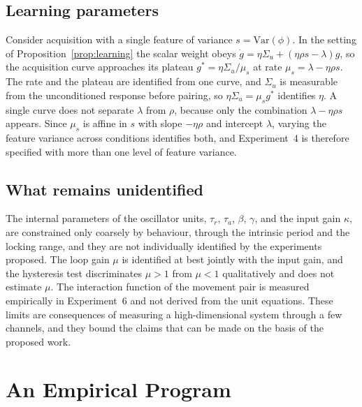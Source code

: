 \documentclass[11pt]{article}
\theoremstyle{plain}
\theoremstyle{definition}
\begin{document}
\subsection{Learning parameters}

Consider acquisition with a single feature of variance $s=\mathrm{Var}(\phi)$. In the setting of Proposition~\ref{prop:learning} the scalar weight obeys $\dot g=\eta\Sigma_u+(\eta\rho s-\lambda)g$, so the acquisition curve approaches its plateau $g^{\ast}=\eta\Sigma_u/\mu_s$ at rate $\mu_s=\lambda-\eta\rho s$. The rate and the plateau are identified from one curve, and $\Sigma_u$ is measurable from the unconditioned response before pairing, so $\eta\Sigma_u=\mu_s g^{\ast}$ identifies $\eta$. A single curve does not separate $\lambda$ from $\rho$, because only the combination $\lambda-\eta\rho s$ appears. Since $\mu_s$ is affine in $s$ with slope $-\eta\rho$ and intercept $\lambda$, varying the feature variance across conditions identifies both, and Experiment~4 is therefore specified with more than one level of feature variance.

\subsection{What remains unidentified}

The internal parameters of the oscillator units, $\tau_r$, $\tau_a$, $\beta$, $\gamma$, and the input gain $\kappa$, are constrained only coarsely by behaviour, through the intrinsic period and the locking range, and they are not individually identified by the experiments proposed. The loop gain $\mu$ is identified at best jointly with the input gain, and the hysteresis test discriminates $\mu>1$ from $\mu<1$ qualitatively and does not estimate $\mu$. The interaction function of the movement pair is measured empirically in Experiment~6 and not derived from the unit equations. These limits are consequences of measuring a high-dimensional system through a few channels, and they bound the claims that can be made on the basis of the proposed work.

\section{An Empirical Program}\label{sec:program}
\end{document}
